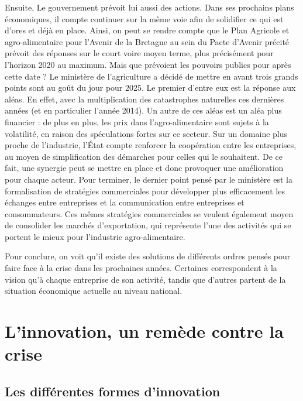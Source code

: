 \documentclass[a4paper,12pt]{report}
\begin{document}
			Ensuite, Le gouvernement prévoit lui aussi des actions. Dans ses prochains plans économiques, il compte continuer sur la même voie afin de solidifier ce qui est d’ores et déjà en place. Ainsi, on peut se rendre compte que le Plan Agricole et agro-alimentaire pour l’Avenir de la Bretagne au sein du Pacte d’Avenir précité prévoit des réponses sur le court voire moyen terme, plus précisément pour l’horizon 2020 au maximum. Mais que prévoient les pouvoirs publics pour après cette date ? Le ministère de l’agriculture a décidé de mettre en avant trois grands points sont au goût du jour pour 2025\cite{AvenirFiliereAgricole2025}. Le premier d’entre eux est la réponse aux aléas. En effet, avec la multiplication des catastrophes naturelles ces dernières années (et en particulier l’année 2014). Un autre de ces aléas est un aléa plus financier : de plus en plus, les prix dans l’agro-alimentaire sont sujets à la volatilité, en raison des spéculations fortes sur ce secteur. Sur un domaine plus proche de l’industrie, l’État compte renforcer la coopération entre les entreprises, au moyen de simplification des démarches pour celles qui le souhaitent. De ce fait, une synergie peut se mettre en place et donc provoquer une amélioration pour chaque acteur. Pour terminer, le dernier point pensé par le ministère est la formalisation de stratégies commerciales pour développer plus efficacement les échanges entre entreprises et la communication entre entreprises et consommateurs. Ces mêmes stratégies commerciales se veulent également moyen de consolider les marchés d’exportation, qui représente l’une des activités qui se portent le mieux pour l’industrie agro-alimentaire.
			
			Pour conclure, on voit qu’il existe des solutions de différents ordres pensés pour faire face à la crise dans les prochaines années. Certaines correspondent à la vision qu’à chaque entreprise de son activité, tandis que d’autres partent de la situation économique actuelle au niveau national.
			
\chapter{L'innovation, un remède contre la crise}
	
	\section{Les différentes formes d'innovation}
	
\end{document}
